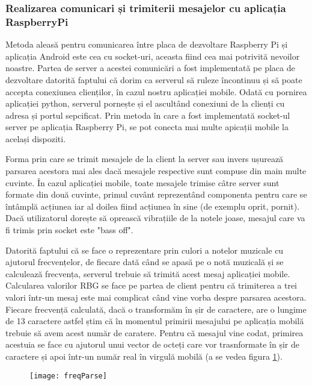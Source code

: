 \documentclass[../IoMusT.tex]{subfiles}
\begin{document}
\subsubsection{Realizarea comunicari și trimiterii mesajelor cu aplicația RaspberryPi}
Metoda aleasă pentru comunicarea între placa de dezvoltare Raspberry Pi și aplicația Android este cea cu socket-uri, aceasta fiind cea mai potrivită nevoilor noastre. Partea de server a acestei comunicări a fost implementată pe placa de dezvoltare datorită faptului că dorim ca serverul să ruleze încontinuu și să poate accepta conexiunea clienților, în cazul nostru aplicației mobile. Odată cu pornirea aplicației python, serverul pornește și el ascultând conexiuni de la clienți cu adresa și portul sepcificat. Prin metoda în care a fost implementată socket-ul server pe aplicația Raspberry Pi, se pot conecta mai multe apicații mobile la același dispoziti.
\\
\par Forma prin care se trimit mesajele de la client la server sau invers ușurează parsarea acestora mai ales dacă mesajele respective sunt compuse din main multe cuvinte. În cazul aplicației mobile, toate mesajele trimise câtre server sunt formate din două cuvinte, primul cuvânt reprezentând componenta pentru care se întâmplă acțiunea iar al doilea fiind acțiunea în sine (de exemplu oprit, pornit). Dacă utilizatorul dorește să oprească vibrațiile de la notele joase, mesajul care va fi trimis prin socket este "bass off". 
\\
\par Datorită faptului că se face o reprezentare prin culori a notelor muzicale cu ajutorul frecvențelor, de fiecare dată când se apasă pe o notă muzicală și se calculează frecvența, serverul trebuie să trimită acest mesaj aplicației mobile. Calcularea valorilor RBG se face pe partea de client pentru că trimiterea a trei valori într-un mesaj este mai complicat când vine vorba despre parsarea acestora. Fiecare frecvență calculată, dacă o transformăm în șir de caractere, are o lungime de 13 caractere astfel știm că în momentul primirii mesajului pe aplicația mobilă trebuie să avem acest număr de caratere. Pentru că mesajul vine codat, primirea acestuia se face cu ajutorul unui vector de octeți care vor trasnformate în șir de caractere și apoi într-un număr real în virgulă mobilă (a se vedea figura \ref{fig:freqParse}).
\begin{figure}[h]
\centering
\texttt{[image: freqParse]}
\caption{}
\label{fig:freqParse}
\end{figure} 
\end{document}
